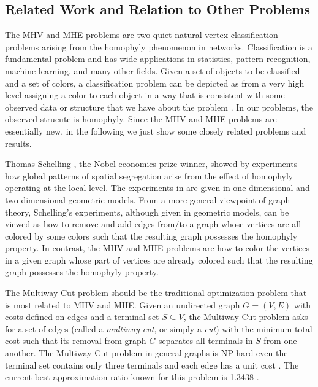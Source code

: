 \documentclass[11pt]{article}
\begin{document}
\subsection{Related Work and Relation to Other Problems}
\label{sec - related works}
The MHV and MHE problems are two quiet natural vertex classification problems
arising from the homophyly phenomenon in networks.
Classification is a fundamental problem and has wide applications in
statistics, pattern recognition, machine learning, and many other fields.
Given a set of objects to be classified and a set of colors, a classification
problem can be depicted as from a very high level assigning a color to
each object in a way that is consistent with some observed data or structure
that we have about the problem \cite{BFOS84,KT02}.
In our problems, the observed strucute is homophyly.
Since the MHV and MHE problems are essentially new, in the following we just
show some closely related problems and results.

Thomas Schelling \cite{S72,S78}, the Nobel economics prize winner, showed
by experiments how global patterns of spatial segregation arise from the
effect of homophyly operating at the local level.
The experiments in \cite{S72} are given in one-dimensional and two-dimensional
geometric models.
From a more general viewpoint of graph theory, Schelling's experiments,
although given in geometric models, can be viewed as how to remove and add
edges from/to a graph whose vertices are all colored by some colors
such that the resulting graph possesses the homophyly property.
In contrast, the MHV and MHE problems are how to color the vertices
in a given graph whose part of vertices are already colored such that
the resulting graph possesses the homophyly property.

The Multiway Cut problem \cite{EL92,DJP+94,CKR00,KKS+04} should be
the traditional optimization problem that is most related to MHV and MHE.
Given an undirected graph $G = (V, E)$ with costs defined on edges and
a terminal set $S \subseteq V$, the Multiway Cut problem asks for a set
of edges (called a {\em multiway cut}, or simply a {\em cut}) with the minimum
total cost such that its removal from graph $G$ separates all terminals in $S$
from one another. The Multiway Cut problem in general graphs is NP-hard even
the terminal set contains only three terminals and each edge has a unit
cost \cite{DJP+94}. The current best approximation ratio known for this
problem is 1.3438 \cite{KKS+04}.
\end{document}
